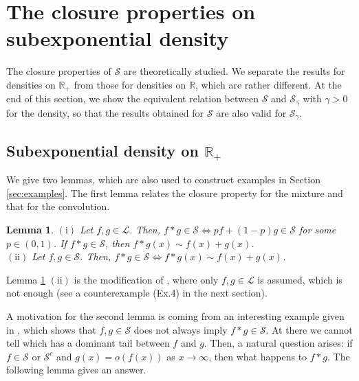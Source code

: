 \documentclass[12pt,leqno]{amsart}
\newtheorem{lemma}{Lemma}[section]
\newcommand{\R}{\mathbb{R}}
\newcommand{\cals}{{\mathcal S}}
\newcommand{\call}{{\mathcal L}}
\newcommand{\1}{{\mathbf 1}}
\begin{document}
\section{The closure properties on subexponential density}
\label{sec:theory:closure:properites}
The closure properties of $\cals$ are theoretically studied. 
We separate the results for densities on $\R_+$ from those for densities on $\R$, which 
are rather different. 
At the end of this section, we show the equivalent relation between $\cals$ and $\cals_\gamma$ with $\gamma>0$ for the density, 
so that the results obtained for $\cals$ are also valid for $\cals_\gamma$. 

\subsection{Subexponential density on $\R_+$}
\label{sec:theory:closure:properites:positive}
We give two lemmas, which are also used to construct examples in Section \ref{sec:examples}. 
The first lemma relates the closure property for the mixture and that for the convolution. 
\begin{lemma}
\label{lem:conv:sum}
$(\mathrm{i})$ Let $f,g \in \call$. Then, $f\ast g\in\cals \Leftrightarrow %
 pf+(1-p)g\in \cals$ for some $p\in(0,1)$.
If $f\ast g \in \cals$, then $f\ast g(x)\sim f(x)+g(x)$. \\
$(\mathrm{ii})$  
Let $f,g \in \cals$. Then, $f\ast g \in \cals \Leftrightarrow %
f\ast g(x) \sim f(x)+g(x)$. 
\end{lemma}
Lemma \ref{lem:conv:sum} $(\mathrm{ii})$ is the modification of \cite[Lemma 2]{Kluppelberg:Villasenor:1991}, where only $f,g\in \call$ 
is assumed, which is not enough (see a counterexample (Ex.4) in the next section).

A motivation for the second lemma is coming from an interesting example given in \cite[Section 3]{Kluppelberg:Villasenor:1991}, 
which shows that $f,g\in \cals$ does not always imply $f\ast g\in \cals$. At there we cannot tell which has a dominant tail between 
$f$ and $g$. Then, a natural question arises: if $f\in \cals$ or $\cals^c$ and $g(x)=o(f(x))$ as $x\to\infty$, then what happens to 
$f\ast g$. The following lemma gives an answer. 
\end{document}
